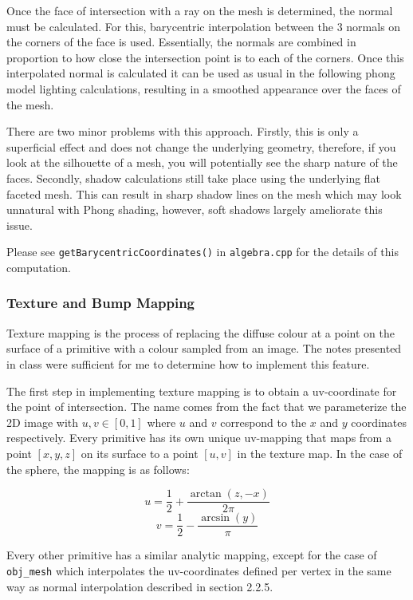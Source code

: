 \documentclass[12pt]{article}
\begin{document}
Once the face of intersection with a ray on the mesh is determined, the normal must be calculated. For this, barycentric interpolation between the 3 normals on the corners of the face is used. Essentially, the normals are combined in proportion to how close the intersection point is to each of the corners. Once this interpolated normal is calculated it can be used as usual in the following phong model lighting calculations, resulting in a smoothed appearance over the faces of the mesh.

There are two minor problems with this approach. Firstly, this is only a superficial effect and does not change the underlying geometry, therefore, if you look at the silhouette of a mesh, you will potentially see the sharp nature of the faces. Secondly, shadow calculations still take place using the underlying flat faceted mesh. This can result in sharp shadow lines on the mesh which may look unnatural with Phong shading, however, soft shadows largely ameliorate this issue.

Please see \texttt{getBarycentricCoordinates()} in \texttt{algebra.cpp} for the details of this computation.


\subsubsection{Texture and Bump Mapping}

Texture mapping is the process of replacing the diffuse colour at a point on the surface of a primitive with a colour sampled from an image. The notes presented in class were sufficient for me to determine how to implement this feature.

The first step in implementing texture mapping is to obtain a uv-coordinate for the point of intersection. The name comes from the fact that we parameterize the 2D image with $u,v\in[0,1]$ where $u$ and $v$ correspond to the $x$ and $y$ coordinates respectively. Every primitive has its own unique uv-mapping that maps from a point $[x,y,z]$ on its surface to a point $[u,v]$ in the texture map. In the case of the sphere, the mapping is as follows:

$$ u=\frac{1}{2}+\frac{\arctan(z,-x)}{2\pi}$$
$$ v=\frac{1}{2}-\frac{\arcsin(y)}{\pi}$$

Every other primitive has a similar analytic mapping, except for the case of \texttt{obj\_mesh} which interpolates the uv-coordinates defined per vertex in the same way as normal interpolation described in section 2.2.5.
\end{document}
